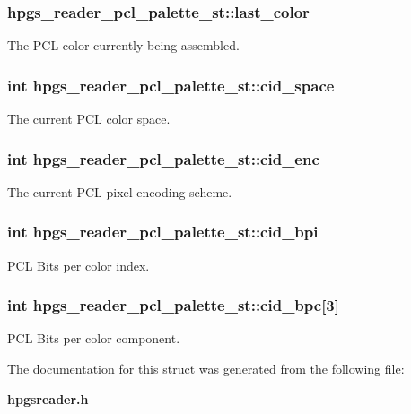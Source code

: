 \subsubsection[last\_\-color]{ {\bf hpgs\_\-reader\_\-pcl\_\-palette\_\-st::last\_\-color}}\label{structhpgs__reader__pcl__palette__st_50da3dcb4c2daf88010b738911974067}


The PCL color currently being assembled. 
\subsubsection[cid\_\-space]{\setlength{\rightskip}{0pt plus 5cm}int {\bf hpgs\_\-reader\_\-pcl\_\-palette\_\-st::cid\_\-space}}\label{structhpgs__reader__pcl__palette__st_ce3db697f9516fac5a49520703121254}


The current PCL color space. 
\subsubsection[cid\_\-enc]{\setlength{\rightskip}{0pt plus 5cm}int {\bf hpgs\_\-reader\_\-pcl\_\-palette\_\-st::cid\_\-enc}}\label{structhpgs__reader__pcl__palette__st_e5087fbe950254566bfabdd670d727d8}


The current PCL pixel encoding scheme. 
\subsubsection[cid\_\-bpi]{\setlength{\rightskip}{0pt plus 5cm}int {\bf hpgs\_\-reader\_\-pcl\_\-palette\_\-st::cid\_\-bpi}}\label{structhpgs__reader__pcl__palette__st_fcf9de2306283e738215d312455cc222}


PCL Bits per color index. 
\subsubsection[cid\_\-bpc]{\setlength{\rightskip}{0pt plus 5cm}int {\bf hpgs\_\-reader\_\-pcl\_\-palette\_\-st::cid\_\-bpc}[3]}\label{structhpgs__reader__pcl__palette__st_7fcff7f264204990c01632d0a603d6e2}


PCL Bits per color component. 

The documentation for this struct was generated from the following file:\begin{CompactItemize}
\item 
{\bf hpgsreader.h}\end{CompactItemize}
